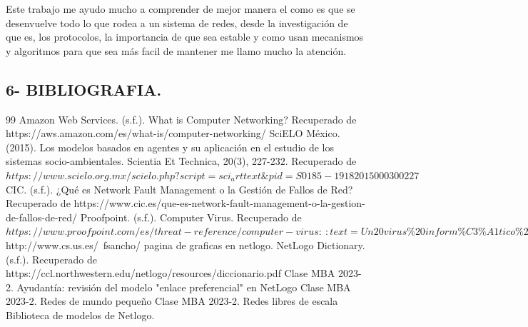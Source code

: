 \documentclass[12pt]{article}
\begin{document}
Este trabajo me ayudo mucho a comprender de mejor manera el como es que se desenvuelve todo lo que rodea a un sistema de redes, desde la investigación de que es, los protocolos, la importancia de que sea estable y como usan mecanismos y algoritmos para que sea más facil de mantener me llamo mucho la atención.\\



{\color{blue} \subsection*{6- BIBLIOGRAFIA.}}
\vspace{1em}

\begin{thebibliography}{99}
    Amazon Web Services. (s.f.). What is Computer Networking? Recuperado de https://aws.amazon.com/es/what-is/computer-networking/
    SciELO México. (2015). Los modelos basados en agentes y su aplicación en el estudio de los sistemas socio-ambientales. Scientia Et Technica, 20(3), 227-232. Recuperado de $https://www.scielo.org.mx/scielo.php?script=sci_arttext\&pid=S0185-19182015000300227$
    CIC. (s.f.). ¿Qué es Network Fault Management o la Gestión de Fallos de Red? Recuperado de https://www.cic.es/que-es-network-fault-management-o-la-gestion-de-fallos-de-red/
    Proofpoint. (s.f.). Computer Virus. Recuperado de $https://www.proofpoint.com/es/threat-reference/computer-virus:~:text=Un20virus\%20inform\%C3\%A1tico\%20es\%20una,un\%20dispositivo\%20o\%20red\%20local.$
    http://www.cs.us.es/~fsancho/ pagina de graficas en netlogo.
    NetLogo Dictionary. (s.f.). Recuperado de https://ccl.northwestern.edu/netlogo/resources/diccionario.pdf
    Clase MBA 2023-2. Ayudantía: revisión del modelo "enlace preferencial" en NetLogo
    Clase MBA 2023-2. Redes de mundo pequeño
    Clase MBA 2023-2. Redes libres de escala
     Biblioteca de modelos de Netlogo.
\end{thebibliography}
\end{document}
